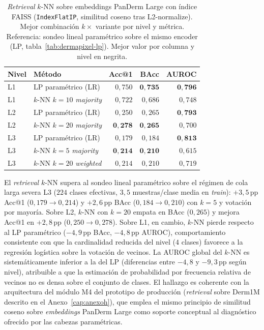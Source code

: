 \begin{table}[H]
\centering
\footnotesize
\setlength{\tabcolsep}{4pt}
\renewcommand{\arraystretch}{0.95}
\caption{\emph{Retrieval} $k$-NN sobre embeddings PanDerm Large
con índice FAISS (\texttt{IndexFlatIP}, similitud coseno tras
L2-normalize). Mejor combinación $k \times $ variante por nivel y
métrica. Referencia: sondeo lineal paramétrico sobre el mismo
encoder (LP, tabla~\ref{tab:dermapixel-lp}). Mejor valor por
columna y nivel en negrita.}
\label{tab:dermapixel-extra-faiss}
\begin{tabular}{llrrr}
\hline
Nivel & Método & Acc@1 & BAcc & AUROC \\
\hline
L1 & LP paramétrico (LR)              & $0{,}750$          & $\mathbf{0{,}735}$ & $\mathbf{0{,}796}$ \\
L1 & $k$-NN $k=10$ \emph{majority}     & $0{,}722$          & $0{,}686$          & $0{,}748$ \\
\hline
L2 & LP paramétrico (LR)              & $0{,}250$          & $0{,}265$          & $\mathbf{0{,}793}$ \\
L2 & $k$-NN $k=20$ \emph{majority}     & $\mathbf{0{,}278}$ & $\mathbf{0{,}265}$ & $0{,}700$ \\
\hline
L3 & LP paramétrico (LR)              & $0{,}179$          & $0{,}184$          & $\mathbf{0{,}813}$ \\
L3 & $k$-NN $k=5$ \emph{majority}      & $\mathbf{0{,}214}$ & $\mathbf{0{,}210}$ & $0{,}615$ \\
L3 & $k$-NN $k=20$ \emph{weighted}     & $0{,}214$          & $0{,}210$          & $0{,}719$ \\
\hline
\end{tabular}
\end{table}

El \emph{retrieval} $k$-NN supera al sondeo lineal paramétrico
sobre el régimen de cola larga severa L3 ($224$ clases efectivas,
$3{,}5$ muestras/clase media en \emph{train}): $+3{,}5$\,pp
Acc@1 ($0{,}179 \to 0{,}214$) y $+2{,}6$\,pp BAcc
($0{,}184 \to 0{,}210$) con $k = 5$ y votación por mayoría. Sobre
L2, $k$-NN con $k = 20$ empata en BAcc ($0{,}265$) y mejora
Acc@1 en $+2{,}8$\,pp ($0{,}250 \to 0{,}278$). Sobre L1, en
cambio, $k$-NN pierde respecto al LP paramétrico
($-4{,}9$\,pp BAcc, $-4{,}8$\,pp AUROC), comportamiento
consistente con que la cardinalidad reducida del nivel ($4$ clases)
favorece a la regresión logística sobre la votación de vecinos. La
AUROC global del $k$-NN es sistemáticamente inferior a la del LP
(diferencias entre $-4{,}8$ y $-9{,}3$\,pp según nivel),
atribuible a que la estimación de probabilidad por frecuencia
relativa de vecinos no es densa sobre el conjunto de clases. El
hallazgo es coherente con la arquitectura del módulo M4 del
prototipo de producción (\emph{retrieval} sobre Derm1M descrito en
el Anexo~\ref{cap:anexoh}), que emplea el mismo principio de
similitud coseno sobre \emph{embeddings} PanDerm Large como
soporte conceptual al diagnóstico ofrecido por las cabezas
paramétricas.

